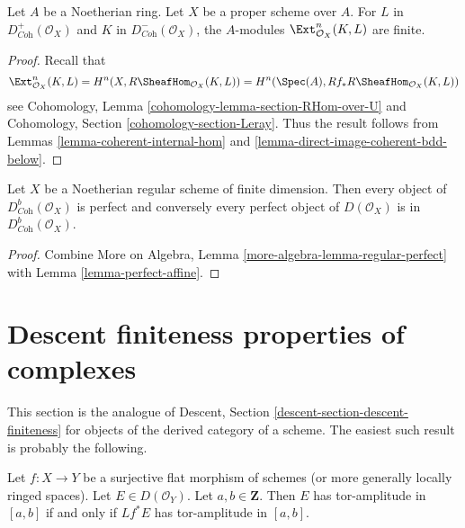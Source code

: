 \begin{lemma}
\label{lemma-ext-finite}
Let $A$ be a Noetherian ring. Let $X$ be a proper scheme over $A$.
For $L$ in
$D^+_{\textit{Coh}}(\mathcal{O}_X)$ and $K$ in
$D^-_{\textit{Coh}}(\mathcal{O}_X)$, the $A$-modules
$\Ext_{\mathcal{O}_X}^n(K, L)$ are finite.
\end{lemma}

\begin{proof}
Recall that
$$
\Ext_{\mathcal{O}_X}^n(K, L) =
H^n(X, R\SheafHom_{\mathcal{O}_X}(K, L)) =
H^n(\Spec(A), Rf_*R\SheafHom_{\mathcal{O}_X}(K, L))
$$
see Cohomology, Lemma \ref{cohomology-lemma-section-RHom-over-U}
and Cohomology, Section \ref{cohomology-section-Leray}.
Thus the result follows from
Lemmas \ref{lemma-coherent-internal-hom} and
\ref{lemma-direct-image-coherent-bdd-below}.
\end{proof}

\begin{lemma}
\label{lemma-perfect-on-regular}
Let $X$ be a Noetherian regular scheme of finite dimension. Then
every object of $D^b_{\textit{Coh}}(\mathcal{O}_X)$ is perfect
and conversely every perfect object of $D(\mathcal{O}_X)$
is in $D^b_{\textit{Coh}}(\mathcal{O}_X)$.
\end{lemma}

\begin{proof}
Combine More on Algebra, Lemma \ref{more-algebra-lemma-regular-perfect}
with Lemma \ref{lemma-perfect-affine}.
\end{proof}




\section{Descent finiteness properties of complexes}
\label{section-descent-finiteness}

\noindent
This section is the analogue of
Descent, Section \ref{descent-section-descent-finiteness}
for objects of the derived category of a scheme.
The easiest such result is probably the following.

\begin{lemma}
\label{lemma-tor-amplitude-descends}
Let $f : X \to Y$ be a surjective flat morphism of schemes
(or more generally locally ringed spaces).
Let $E \in D(\mathcal{O}_Y)$. Let $a, b \in \mathbf{Z}$.
Then $E$ has tor-amplitude in $[a, b]$ if and only if
$Lf^*E$ has tor-amplitude in $[a, b]$.
\end{lemma}

